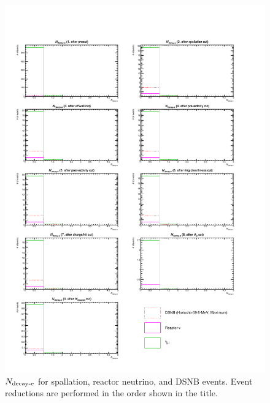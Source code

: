 \begin{figure}[h]
	\centering
	\includegraphics[width=15cm]{PDF/Dist_Nuebar/Che_50deg_tag_ge1/nmue}
	\caption[$N_{\rm decay\mathchar`-e}$ for spallation, reactor neutrino, and DSNB events]{
	$N_{\rm decay\mathchar`-e}$ for spallation, reactor neutrino, and DSNB events.
	Event reductions are performed in the order shown in the title.
	}\label{Nuebar_nmue}
\end{figure}

